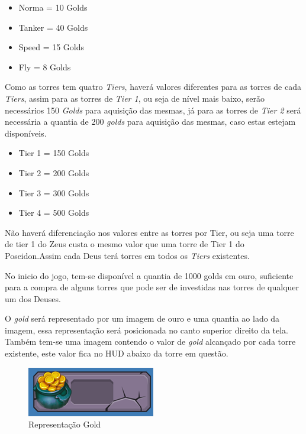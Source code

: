 \documentclass[11pt]{article} %
\begin{document}
\begin{itemize}
 \item Norma = 10 Golds
 \item Tanker = 40 Golds
 \item Speed = 15 Golds
 \item Fly = 8 Golds
 \end{itemize} 
 
Como as torres tem quatro \textit{Tiers}, haverá valores diferentes para as torres de cada \textit{Tiers}, assim para as torres de \textit{Tier 1}, ou seja de nível mais baixo, serão necessários 150 \textit{Golds} para aquisição das mesmas, já para as torres de \textit{Tier 2} será necessária a quantia de 200 \textit{golds} para aquisição das mesmas, caso estas estejam disponíveis.

\begin{itemize}
 \item Tier 1 = 150 Golds
 \item Tier 2 = 200 Golds
 \item Tier 3 = 300 Golds
 \item Tier 4 = 500 Golds
 \end{itemize} 
 
 
Não haverá diferenciação nos valores entre as torres por Tier, ou seja uma torre de tier 1 do Zeus custa o mesmo valor que uma torre de Tier 1 do Poseidon.Assim cada Deus terá torres em todos os \textit{Tiers} existentes.
 
No inicio do jogo, tem-se disponível a quantia de 1000 golds em ouro, suficiente para a compra de alguns torres que pode ser de investidas nas torres de qualquer um dos Deuses.
 
O \textit{gold} será representado por um imagem de ouro e uma quantia ao lado da imagem, essa representação será posicionada no canto superior direito da tela. Também tem-se uma imagem contendo o valor de \textit{gold} alcançado por cada torre existente, este valor fica no HUD abaixo da torre em questão.

\begin{figure}[!htp]
\centering
\includegraphics[scale=1.25]{res/gold.png}
\caption{Representação Gold}
\label{Tela Equip}
\end{figure}
\end{document}
